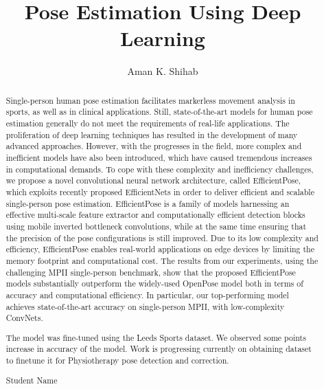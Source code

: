 \documentclass{fisatprojectfinal}
\title{Pose Estimation Using Deep Learning}
\author{Aman K. Shihab}
\begin{document}
\maketitle
\makecert

\newpage
{}
\setcounter{page}{1}
\thispagestyle{plain}
\renewcommand\abstractname{ABSTRACT}
\begin{abstract}
\vspace{5cm}
Single-person human pose estimation facilitates markerless movement analysis in sports, as well as in clinical applications.
Still, state-of-the-art models for human pose estimation generally do not meet the requirements of real-life applications.
The proliferation of deep learning techniques has resulted in the development of many advanced approaches. However,
with the progresses in the field, more complex and inefficient models have also been introduced, which have caused
tremendous increases in computational demands. To cope with these complexity and inefficiency challenges, we propose
a novel convolutional neural network architecture, called EfficientPose, which exploits recently proposed EfficientNets
in order to deliver efficient and scalable single-person pose estimation. EfficientPose is a family of models harnessing
an effective multi-scale feature extractor and computationally efficient detection blocks using mobile inverted bottleneck
convolutions, while at the same time ensuring that the precision of the pose configurations is still improved. Due to its low
complexity and efficiency, EfficientPose enables real-world applications on edge devices by limiting the memory footprint
and computational cost. The results from our experiments, using the challenging MPII single-person benchmark, show that
the proposed EfficientPose models substantially outperform the widely-used OpenPose model both in terms of accuracy and
computational efficiency. In particular, our top-performing model achieves state-of-the-art accuracy on single-person MPII,
with low-complexity ConvNets.
\end{abstract}



\newpage
\renewcommand\abstractname{Contribution by Author}
\thispagestyle{plain}
\begin{abstract}
\vspace{5cm}
The model was fine-tuned using the Leeds Sports dataset. We observed some points increase in accuracy of the model.
Work is progressing currently on obtaining dataset to finetune it for Physiotherapy pose detection and correction.
\vspace{1cm}
\begin{flushright}
Student Name
\end{flushright}
\end{abstract}
\end{document}

